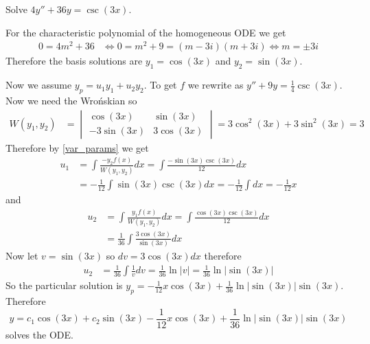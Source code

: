 \documentclass[notes]{subfiles}
\begin{document}
\begin{exercise}
    Solve $4y'' + 36y = \csc(3x)$.
\end{exercise}
\begin{solution}
    For the characteristic polynomial of the homogeneous ODE we get
    \begin{align*}
        0 = 4m^2 + 36
        &\iff 0 = m^2 + 9 = (m - 3i)(m + 3i)
        \iff m = \pm 3i
    \end{align*}
    Therefore the basis solutions are $y_1 = \cos(3x)$ and $y_2 = \sin(3x)$.
    
    Now we assume $y_p = u_1y_1 + u_2y_2$. To get $f$ we rewrite as $y'' + 9y = \frac{1}{4}\csc(3x)$. Now we need the Wro\'nskian so
    \begin{align*}
        W(y_1, y_2)
        &= \begin{vmatrix}
            \cos(3x) & \sin(3x) \\
            -3\sin(3x) & 3\cos(3x)
        \end{vmatrix}
        = 3\cos^2(3x) + 3\sin^2(3x)
        = 3
    \end{align*}
    Therefore by \cref{var_params} we get
    \begin{align*}
        u_1
        &= \int \frac{-y_2f(x)}{W(y_1, y_2)} dx
        = \int \frac{-\sin(3x)\csc(3x)}{12} dx \\
        &= -\frac{1}{12} \int \sin(3x)\csc(3x) dx
        = -\frac{1}{12} \int dx
        = -\frac{1}{12}x
    \end{align*}
    and
    \begin{align*}
        u_2
        &= \int \frac{y_1f(x)}{W(y_1, y_2)} dx
        = \int \frac{\cos(3x)\csc(3x)}{12} dx \\
        &= \frac{1}{36} \int \frac{3\cos(3x)}{\sin(3x)} dx
    \end{align*}
    Now let $v = \sin(3x)$ so $dv = 3\cos(3x)dx$ therefore
    \begin{align*}
        u_2
        &= \frac{1}{36} \int \frac{1}{v} dv
        = \frac{1}{36}\ln|v|
        = \frac{1}{36}\ln\left|\sin(3x)\right|
    \end{align*}
    So the particular solution is $y_p = -\frac{1}{12}x\cos(3x) + \frac{1}{36}\ln\left|\sin(3x)\right|\sin(3x)$. Therefore
    \[
        y = c_1 \cos(3x) + c_2\sin(3x) - \frac{1}{12}x\cos(3x) + \frac{1}{36}\ln\left|\sin(3x)\right|\sin(3x)
    \]
    solves the ODE.
\end{solution}
\end{document}

